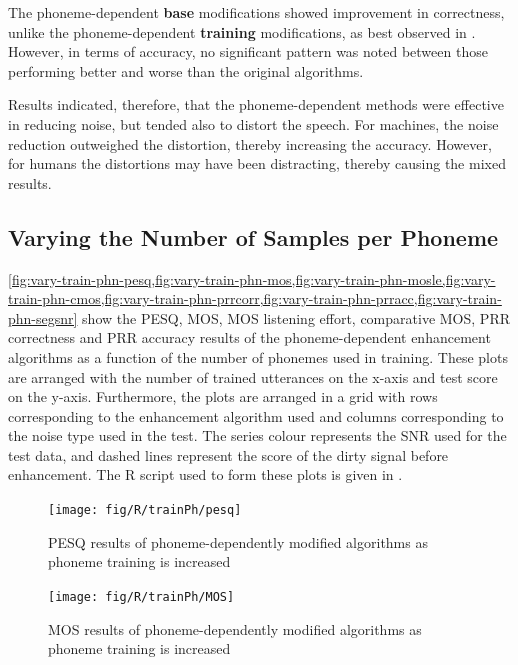 The phoneme-dependent \textbf{base} modifications showed improvement
in correctness, unlike the phoneme-dependent \textbf{training} modifications,
as best observed in . However, in
terms of accuracy, no significant pattern was noted between those
performing better and worse than the original algorithms.

Results indicated, therefore, that the phoneme-dependent methods were
effective in reducing noise, but tended also to distort the speech.
For machines, the noise reduction outweighed the distortion, thereby
increasing the accuracy. However, for humans the distortions may have
been distracting, thereby causing the mixed results.


\subsection{\label{sub:Varying-Phns}Varying the Number of Samples per Phoneme}

\cref{fig:vary-train-phn-pesq,fig:vary-train-phn-mos,fig:vary-train-phn-mosle,fig:vary-train-phn-cmos,fig:vary-train-phn-prrcorr,fig:vary-train-phn-prracc,fig:vary-train-phn-segsnr}
show the \ac{PESQ}, \ac{MOS}, \ac{MOS} listening effort, comparative
\ac{MOS}, \ac{PRR} correctness and \ac{PRR} accuracy results of
the phoneme-dependent enhancement algorithms as a function of the
number of phonemes used in training. These plots are arranged with
the number of trained utterances on the x-axis and test score on the
y-axis. Furthermore, the plots are arranged in a grid with rows corresponding
to the enhancement algorithm used and columns corresponding to the
noise type used in the test. The series colour represents the \ac{SNR}
used for the test data, and dashed lines represent the score of the
dirty signal before enhancement. The R script used to form these plots
is given in .

\begin{figure}[p]
\noindent \begin{centering}
\texttt{[image: fig/R/trainPh/pesq]}
\par\end{centering}

\protect\caption{\label{fig:vary-train-phn-pesq}\acs{PESQ} results of phoneme-dependently
modified algorithms as phoneme training is increased}
\end{figure}


\begin{figure}[p]
\noindent \begin{centering}
\texttt{[image: fig/R/trainPh/MOS]}
\par\end{centering}

\protect\caption{\label{fig:vary-train-phn-mos}\acs{MOS} results of phoneme-dependently
modified algorithms as phoneme training is increased}
\end{figure}


